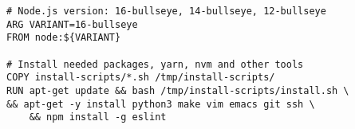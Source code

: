
\begin{lstlisting}[language=docker, frame=single, caption={NodeJS DevContainer Dockerfile},label=code::docker_dev_node]
# Node.js version: 16-bullseye, 14-bullseye, 12-bullseye
ARG VARIANT=16-bullseye
FROM node:${VARIANT}

# Install needed packages, yarn, nvm and other tools
COPY install-scripts/*.sh /tmp/install-scripts/
RUN apt-get update && bash /tmp/install-scripts/install.sh \
&& apt-get -y install python3 make vim emacs git ssh \
    && npm install -g eslint
\end{lstlisting}
